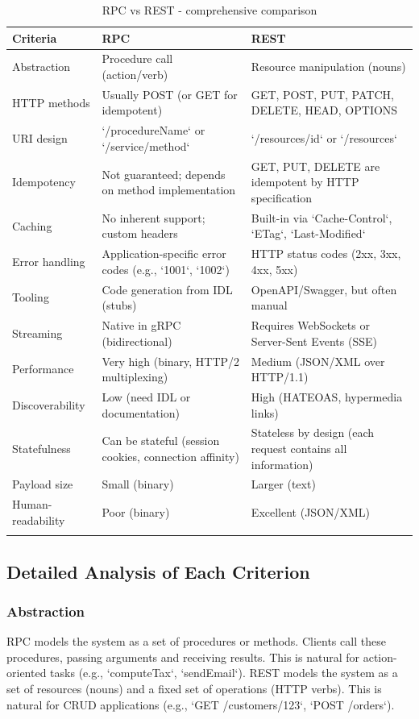 \documentclass[10pt,a4paper]{article}
\begin{document}
\begin{longtable}{|p{3.5cm}|p{5cm}|p{5cm}|}
\hline
\textbf{Criteria} & \textbf{RPC} & \textbf{REST} \\
\hline
Abstraction & Procedure call (action/verb) & Resource manipulation (nouns) \\
HTTP methods & Usually POST (or GET for idempotent) & GET, POST, PUT, PATCH, DELETE, HEAD, OPTIONS \\
URI design & `/procedureName` or `/service/method` & `/resources/{id}` or `/resources` \\
Idempotency & Not guaranteed; depends on method implementation & GET, PUT, DELETE are idempotent by HTTP specification \\
Caching & No inherent support; custom headers & Built-in via `Cache-Control`, `ETag`, `Last-Modified` \\
Error handling & Application-specific error codes (e.g., `1001`, `1002`) & HTTP status codes (2xx, 3xx, 4xx, 5xx) \\
Tooling & Code generation from IDL (stubs) & OpenAPI/Swagger, but often manual \\
Streaming & Native in gRPC (bidirectional) & Requires WebSockets or Server-Sent Events (SSE) \\
Performance & Very high (binary, HTTP/2 multiplexing) & Medium (JSON/XML over HTTP/1.1) \\
Discoverability & Low (need IDL or documentation) & High (HATEOAS, hypermedia links) \\
Statefulness & Can be stateful (session cookies, connection affinity) & Stateless by design (each request contains all information) \\
Payload size & Small (binary) & Larger (text) \\
Human-readability & Poor (binary) & Excellent (JSON/XML) \\
\hline
\caption{RPC vs REST - comprehensive comparison}
\label{tab:rpc_rest}
\end{longtable}

\subsection{Detailed Analysis of Each Criterion}

\subsubsection{Abstraction}
RPC models the system as a set of procedures or methods. Clients call these procedures, passing arguments and receiving results. This is natural for action-oriented tasks (e.g., `computeTax`, `sendEmail`).  
REST models the system as a set of resources (nouns) and a fixed set of operations (HTTP verbs). This is natural for CRUD applications (e.g., `GET /customers/123`, `POST /orders`).
\end{document}
